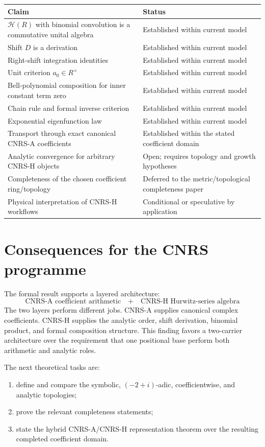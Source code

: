 \documentclass[11pt]{article}
\newcommand{\Hurs}{\mathcal H}
\begin{document}
\begin{longtable}{p{}p{}}
\toprule
Claim & Status \\
\midrule
$\Hurs(R)$ with binomial convolution is a commutative unital algebra & Established within current model \\
Shift $D$ is a derivation & Established within current model \\
Right-shift integration identities & Established within current model \\
Unit criterion $a_0\in R^\times$ & Established within current model \\
Bell-polynomial composition for inner constant term zero & Established within current model \\
Chain rule and formal inverse criterion & Established within current model \\
Exponential eigenfunction law & Established within current model \\
Transport through exact canonical CNRS-A coefficients & Established within the stated coefficient domain \\
Analytic convergence for arbitrary CNRS-H objects & Open; requires topology and growth hypotheses \\
Completeness of the chosen coefficient ring/topology & Deferred to the metric/topological completeness paper \\
Physical interpretation of CNRS-H workflows & Conditional or speculative by application \\
\bottomrule
\end{longtable}

\section{Consequences for the CNRS programme}

The formal result supports a layered architecture:
\[
\boxed{
\text{CNRS-A coefficient arithmetic}
\quad+\quad
\text{CNRS-H Hurwitz-series algebra}
}
\]
The two layers perform different jobs.  CNRS-A supplies canonical complex coefficients.  CNRS-H supplies the analytic order, shift derivation, binomial product, and formal composition structure.  This finding favors a two-carrier architecture over the requirement that one positional base perform both arithmetic and analytic roles.

The next theoretical tasks are:
\begin{enumerate}
\item define and compare the symbolic, $(-2+i)$-adic, coefficientwise, and analytic topologies;
\item prove the relevant completeness statements;
\item state the hybrid CNRS-A/CNRS-H representation theorem over the resulting completed coefficient domain.
\end{enumerate}
\end{document}
